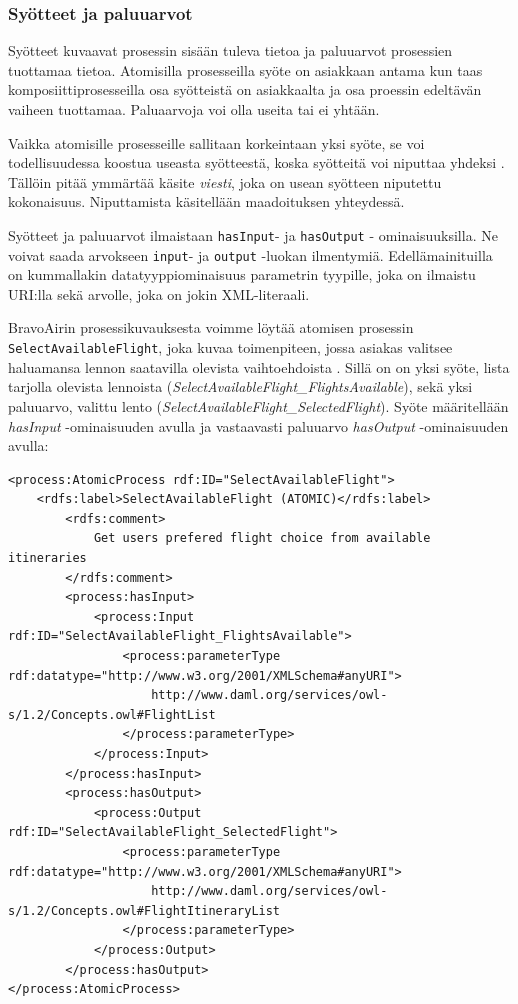 \documentclass[finnish]{tktltiki2}
\theoremstyle{definition}
\theoremstyle{remark}
\begin{document}
\subsubsection{Syötteet ja paluuarvot}

Syötteet kuvaavat prosessin sisään tuleva tietoa ja paluuarvot prosessien tuottamaa tietoa\cite{OWLS}. Atomisilla prosesseilla syöte on asiakkaan antama kun taas komposiittiprosesseilla osa syötteistä on asiakkaalta ja osa proessin edeltävän vaiheen tuottamaa. Paluaarvoja voi olla useita tai ei yhtään\cite{OWLS}. 

Vaikka atomisille prosesseille sallitaan korkeintaan yksi syöte, se voi todellisuudessa koostua useasta syötteestä, koska syötteitä voi niputtaa yhdeksi \cite{OWLS}. Tällöin pitää ymmärtää käsite \textit{viesti}, joka on usean syötteen niputettu kokonaisuus. Niputtamista käsitellään maadoituksen yhteydessä. 

Syötteet ja paluuarvot ilmaistaan \texttt{hasInput}- ja \texttt{hasOutput} - ominaisuuksilla. Ne voivat saada arvokseen \texttt{input}- ja \texttt{output} -luokan ilmentymiä. Edellämainituilla on kummallakin datatyyppiominaisuus parametrin tyypille, joka on ilmaistu URI:lla sekä arvolle, joka on jokin XML-literaali\cite{OWLS}. 

BravoAirin prosessikuvauksesta voimme löytää atomisen prosessin \texttt{SelectAvailableFlight}, joka kuvaa toimenpiteen, jossa asiakas valitsee haluamansa lennon saatavilla olevista vaihtoehdoista \cite{daml}. Sillä on on yksi syöte, lista tarjolla olevista lennoista (\textit{SelectAvailableFlight\_FlightsAvailable}), sekä yksi paluuarvo, valittu lento (\textit{SelectAvailableFlight\_SelectedFlight}). Syöte määritellään \textit{hasInput} -ominaisuuden avulla ja vastaavasti paluuarvo \textit{hasOutput} -ominaisuuden avulla\cite{daml}:

\footnotesize
\begin{verbatim}
<process:AtomicProcess rdf:ID="SelectAvailableFlight">
    <rdfs:label>SelectAvailableFlight (ATOMIC)</rdfs:label>
        <rdfs:comment>
            Get users prefered flight choice from available itineraries
        </rdfs:comment>
        <process:hasInput>
            <process:Input rdf:ID="SelectAvailableFlight_FlightsAvailable">
                <process:parameterType rdf:datatype="http://www.w3.org/2001/XMLSchema#anyURI">
                    http://www.daml.org/services/owl-s/1.2/Concepts.owl#FlightList
                </process:parameterType>
            </process:Input>
        </process:hasInput>
        <process:hasOutput>
            <process:Output rdf:ID="SelectAvailableFlight_SelectedFlight">
                <process:parameterType rdf:datatype="http://www.w3.org/2001/XMLSchema#anyURI">
                    http://www.daml.org/services/owl-s/1.2/Concepts.owl#FlightItineraryList
                </process:parameterType>
            </process:Output>
        </process:hasOutput>
</process:AtomicProcess>
\end{verbatim}
\normalsize
\end{document}
